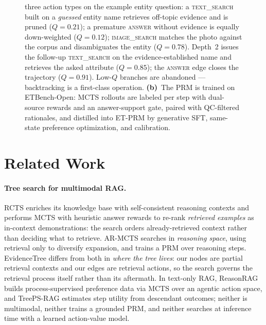 \documentclass[letterpaper,twocolumn,10pt]{article}
\newcommand{\ours}{EvidenceTree}
\newcommand{\dataset}{ETBench-Open}
\newcommand{\prm}{ET-PRM}
\begin{document}
\begin{figure}[t]
{three action types on the example entity question: a \textsc{text\_search}
built on a \emph{guessed} entity name retrieves off-topic evidence and is
pruned ($Q{=}0.21$); a premature \textsc{answer} without evidence is
equally down-weighted ($Q{=}0.12$); \textsc{image\_search} matches the
photo against the corpus and disambiguates the entity ($Q{=}0.78$).
Depth~2 issues the follow-up \textsc{text\_search} on the
evidence-established name and retrieves the asked attribute ($Q{=}0.85$);
the \textsc{answer} edge closes the trajectory ($Q{=}0.91$). Low-$Q$
branches are abandoned --- backtracking is a first-class operation.
\textbf{(b)}~The PRM is trained on \dataset{}: MCTS rollouts are labeled
per step with dual-source rewards and an answer-support gate, paired with
QC-filtered rationales, and distilled into \prm{} by generative SFT,
same-state preference optimization, and calibration.}
\label{fig:overview}
\end{figure}

\section{Related Work}
\label{sec:related}

\paragraph{Tree search for multimodal RAG.}
RCTS \cite{rcts2025} enriches its knowledge base with self-consistent
reasoning contexts and performs MCTS with heuristic answer rewards to
re-rank \emph{retrieved examples} as in-context demonstrations: the
search orders already-retrieved context rather than deciding what to
retrieve. AR-MCTS \cite{dong2025armcts} searches in
\emph{reasoning space}, using retrieval only to diversify expansion, and
trains a PRM over reasoning steps. \ours{} differs from both in \emph{where
the tree lives}: our nodes are partial retrieval contexts and our edges are
retrieval actions, so the search governs the retrieval process itself
rather than its aftermath. In text-only RAG, ReasonRAG
\cite{zhang2025reasonrag} builds process-supervised preference data via
MCTS over an agentic action space, and TreePS-RAG \cite{treeps2026}
estimates step utility from descendant outcomes; neither is multimodal,
neither trains a grounded PRM, and neither searches at inference time with
a learned action-value model.
\end{document}
